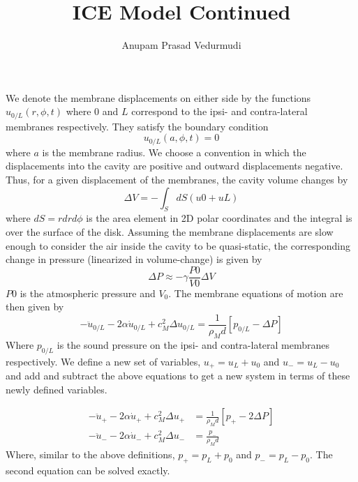 \documentclass[a4paper,10pt]{article}
\title{ICE Model Continued}
\author{Anupam Prasad Vedurmudi}
\begin{document}
\maketitle

We denote the membrane displacements on either side by the
functions $u_{0/L}(r,\phi,t)$ where $0$ and $L$ correspond to the
ipsi- and contra-lateral membranes respectively. They satisfy
the boundary condition
\begin{equation}
 u_{0/L}(a,\phi,t)=0
\end{equation}
where $a$ is the membrane radius. We choose a convention in which
the displacements into the cavity are positive and outward displacements
negative. Thus, for a given displacement of the membranes, 
the cavity volume changes by
\begin{equation}
 \Delta V=-\int_S dS (u0+uL)
\end{equation}
where $dS=rdrd\phi$ is the area element in 2D polar coordinates and 
the integral is over the surface of the disk. Assuming the membrane
displacements are slow enough to consider the air inside the cavity
to be quasi-static, the corresponding change in pressure (linearized
in volume-change) is given by
\begin{equation}
 \Delta P \approx -\gamma \frac{P0}{V0}\Delta V
\end{equation}
$P0$ is the atmospheric pressure and $V_0$. The membrane equations of motion are then given by
\begin{equation}
 -\ddot{u}_{0/L}-2\alpha\dot{u}_{0/L}+c_M^2\Delta u_{0/L}=\frac{1}{\rho_M d}\left[p_{0/L}-\Delta P\right]
\end{equation}
Where $p_{0/L}$ is the sound pressure on the ipsi- and contra-lateral membranes respectively.	 We define 
a new set of variables, $u_+=u_L+u_0$ and $u_-=u_L-u_0$ and add and subtract the above equations to
get a new system in terms of these newly defined variables.

\begin{align}
 -\ddot{u}_+-2\alpha\dot{u}_++c_M^2\Delta u_+&=\frac{1}{\rho_M d}\left[p_+-2\Delta P\right]\\
 -\ddot{u}_--2\alpha\dot{u}_-+c_M^2\Delta u_-&=\frac{p_-}{\rho_M d}
\end{align}
Where, similar to the above definitions, $p_+=p_L+p_0$ and $p_-=p_L-p_0$. The second equation
can be solved exactly.
\end{document}
